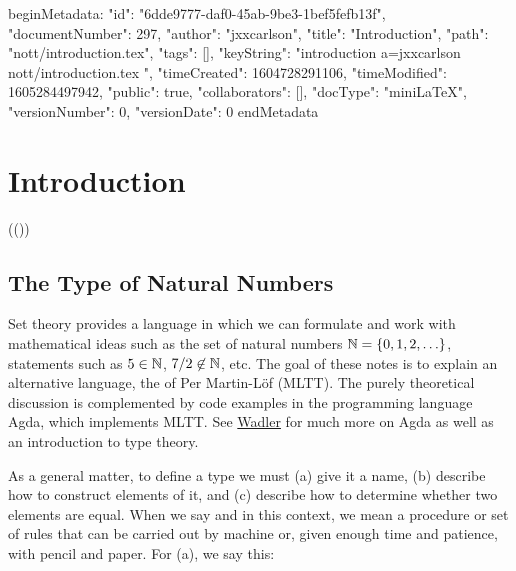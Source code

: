beginMetadata:
{
    "id": "6dde9777-daf0-45ab-9be3-1bef5fefb13f",
    "documentNumber": 297,
    "author": "jxxcarlson",
    "title": "Introduction",
    "path": "nott/introduction.tex",
    "tags": [],
    "keyString": "introduction a=jxxcarlson nott/introduction.tex ",
    "timeCreated": 1604728291106,
    "timeModified": 1605284497942,
    "public": true,
    "collaborators": [],
    "docType": "miniLaTeX",
    "versionNumber": 0,
    "versionDate": 0
}
endMetadata



\section{Introduction}

(())

\innertableofcontents

\subsection{The Type of Natural Numbers}

Set theory provides a language in which we can formulate and work with mathematical ideas such as the set of natural numbers $\mathbb{N} = \{ 0, 1, 2, \ldots \}$, statements such as $5 \in \mathbb{N}$, $7/2 \not\in \mathbb{N}$,  etc.  The goal of these notes is to explain an alternative language, the  of Per Martin-Löf (MLTT).  The purely theoretical discussion is complemented by code examples in the programming language Agda, which implements MLTT.  See \href{https://plfa.github.io/}{Wadler} for much more on Agda as well as an introduction to type theory.

As a general matter,  to define a type we must (a) give it a name, (b) describe how to construct elements of it, and (c) describe how to determine whether two elements are equal.  When we say  and  in this context, we mean a procedure or set of rules that can be carried out by machine or, given enough time and patience, with pencil and paper.  For (a), we say this:

